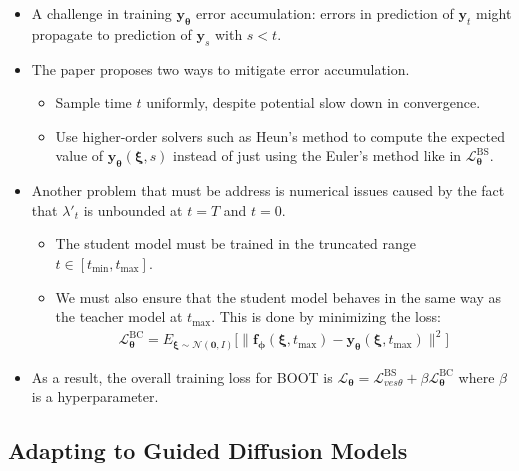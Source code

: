 \documentclass[10pt]{article}
\newcommand{\ve}[1]{\mathbf{#1}}
\newcommand{\ves}[1]{\boldsymbol{#1}}
\newcommand{\mrm}[1]{\mathrm{#1}}
\newcommand{\mcal}[1]{\mathcal{#1}}
\begin{document}
\begin{itemize}
  \item A challenge in training $\ve{y}_{\ves{\theta}}$ error accumulation: errors in prediction of $\ve{y}_t$ might propagate to prediction of $\ve{y}_s$ with $s < t$.
  
  \item The paper proposes two ways to mitigate error accumulation.
  \begin{itemize}
    \item Sample time $t$ uniformly, despite potential slow down in convergence.
    \item Use higher-order solvers such as Heun's method to compute the expected value of $\ve{y}_{\ves{\theta}}(\ves{\xi},s)$ instead of just using the Euler's method like in $\mcal{L}_{\ves{\theta}}^{\mrm{BS}}$.
  \end{itemize}

  \item Another problem that must be address is numerical issues caused by the fact that $\lambda'_t$ is unbounded at $t = T$ and $t = 0$.
  \begin{itemize}
    \item The student model must be trained in the truncated range $t \in [t_{\min}, t_{\max}]$.
    \item We must also ensure that the student model behaves in the same way as the teacher model at $t_{\max}$. This is done by minimizing the loss:
    \begin{align*}
      \mcal{L}_{\ves{\theta}}^{\mrm{BC}} = E_{\ves{\xi} \sim \mcal{N}(\ve{0},I)} \Big[ \| \ve{f}_{\ves{\phi}}(\ves{\xi},t_{\max}) - \ve{y}_{\ves{\theta}}(\ves{\xi},t_{\max}) \|^2 \Big]
    \end{align*}
  \end{itemize}

  \item As a result, the overall training loss for BOOT is $\mcal{L}_{\ves{\theta}} = \mcal{L}_{ves{\theta}}^{\mrm{BS}} + \beta \mcal{L}_{\ves{\theta}}^{\mrm{BC}}$ where $\beta$ is a hyperparameter.
\end{itemize}

\subsection{Adapting to Guided Diffusion Models}
\end{document}
